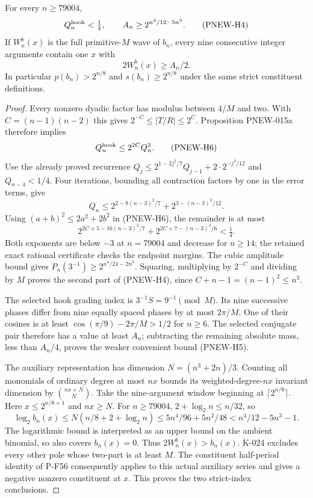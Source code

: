 \begin{proposition}[PNEW-015b]
For every $n\ge79004$,
\[
 Q_n^{\rm hook}<\tfrac14,\qquad
 A_n\ge2^{n^4/12-5n^3}.                                \tag{PNEW-H4}
\]
If $W_n^b(x)$ is the full primitive-$M$ wave of $b_n$, every nine
consecutive integer arguments contain one $x$ with
\[
                       2W_n^b(x)\ge A_n/2.
                                                        \tag{PNEW-H5}
\]
In particular $p(b_n)>2^{n/8}$ and $s(b_n)\ge2^{n/8}$ under the
same strict constituent definitions.
\end{proposition}
\begin{proof}
Every nonzero dyadic factor has modulus between $4/M$ and two.
With $C=(n-1)(n-2)$ this gives $2^{-C}\le|T/R|\le2^C$.
Proposition PNEW-015a therefore implies
\[
                  Q_n^{\rm hook}\le2^{2C}Q_n^2.
                                                        \tag{PNEW-H6}
\]
Use the already proved recurrence
$Q_j\le2^{1-2j^2/7}Q_{j-1}+2\cdot2^{-j^3/12}$ and
$Q_{n-4}<1/4$. Four iterations, bounding all contraction factors
by one in the error terms, give
\[
 Q_n\le2^{2-8(n-3)^2/7}+2^{3-(n-3)^3/12}.
\]
Using $(a+b)^2\le2a^2+2b^2$ in (PNEW-H6), the remainder is at most
\[
 2^{2C+5-16(n-3)^2/7}
          +2^{2C+7-(n-3)^3/6}<\tfrac14.                 \tag{PNEW-H7}
\]
Both exponents are below $-3$ at $n=79004$ and decrease for $n\ge14$;
the retained exact rational certificate checks the endpoint margins.
The cubic amplitude bound gives
$P_n(3^{-1})\ge2^{n^4/24-2n^3}$. Squaring, multiplying by $2^{-C}$
and dividing by $M$ proves the second part of (PNEW-H4), since
$C+n-1=(n-1)^2\le n^3$.

The selected hook grading index is $3^{-1}S=9^{-1}\pmod M$.
Its nine successive phases differ from nine equally spaced phases
by at most $2\pi/M$. One of their cosines is at least
$\cos(\pi/9)-2\pi/M>1/2$ for $n\ge6$.
The selected conjugate pair therefore has a value at least $A_n$;
subtracting the remaining absolute mass, less than $A_n/4$, proves
the weaker convenient bound (PNEW-H5).

The auxiliary representation has dimension $N=(n^3+2n)/3$.
Counting all monomials of ordinary degree at most $nx$ bounds its
weighted-degree-$nx$ invariant dimension by $\binom{nx+N}{N}$.
Take the nine-argument window beginning at $\lceil2^{n/8}\rceil$.
Here $x\le2^{n/8+1}$ and $nx\ge N$. For $n\ge79004$,
$2+\log_2n\le n/32$, so
\[
 \log_2 b_n(x)\le N(n/8+2+\log_2n)
       \le5n^4/96+5n^2/48
       < n^4/12-5n^3-1.
\]
The logarithmic bound is interpreted as an upper bound on the
ambient binomial, so also covers $b_n(x)=0$. Thus $2W_n^b(x)>b_n(x)$.
K-024 excludes every other pole whose two-part is at least $M$.
The constituent half-period identity of P-F56 consequently applies
to this actual auxiliary series and gives a negative nonzero
constituent at $x$. This proves the two strict-index conclusions.
\end{proof}


